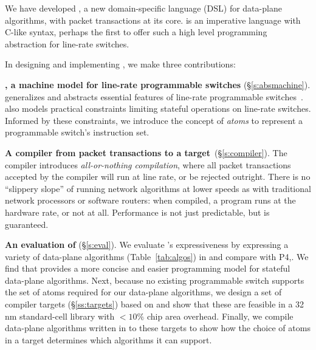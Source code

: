 We have developed {\em \pktlanguage{}}, a new domain-specific language
(DSL) for data-plane algorithms, with packet transactions at its core.
\pktlanguage is an imperative language with C-like syntax, perhaps the
first to offer such a high level programming abstraction for
line-rate switches.



In designing and implementing \pktlanguage, we make three contributions:
\begin{CompactEnumerate}
\item \textbf{\absmachine, a machine model for line-rate programmable
    switches} (\S\ref{s:absmachine}).  \absmachine generalizes and
  abstracts essential features of line-rate programmable
  switches~\cite{rmt, xpliant, flexpipe}. \absmachine also models
  practical constraints limiting stateful operations on line-rate
  switches.  Informed by these constraints, we introduce the concept
  of {\em atoms} to represent a programmable switch's instruction set.

\item \textbf{A compiler from \pktlanguage packet transactions to a
    \absmachine target}~(\S\ref{s:compiler}). The \pktlanguage
  compiler introduces \textit{all-or-nothing compilation}, where all
  packet transactions accepted by the compiler will run at line rate,
  or be rejected outright. There is no ``slippery slope'' of running
  network algorithms at lower speeds as with traditional network
  processors or software routers: when compiled, a \pktlanguage
  program runs at the hardware rate, or not at all. Performance is not
  just predictable, but is guaranteed.


\item \textbf{An evaluation of \pktlanguage} (\S\ref{s:eval}). We evaluate
  \pktlanguage's expressiveness by expressing a variety of data-plane
  algorithms (Table~\ref{tab:algos}) in \pktlanguage and compare with
  P4,. We find that \pktlanguage provides a more concise and easier
  programming model for stateful data-plane algorithms.  Next, because
  no existing programmable switch supports the set of atoms required
  for our data-plane algorithms, we design a set of compiler targets
  (\S\ref{ss:targets}) based on \absmachine and show that these are
  feasible in a 32 nm standard-cell library with $< 10\%$ chip area
  overhead.  Finally, we compile data-plane algorithms written in
  \pktlanguage to these targets to show how the choice of atoms in a
  target determines which algorithms it can support.
\end{CompactEnumerate}

